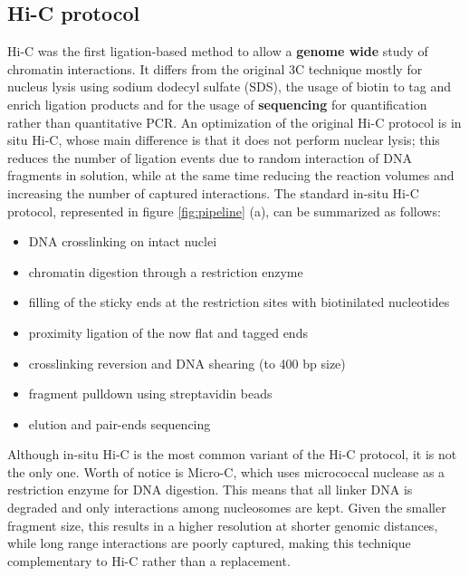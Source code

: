 \subsection{Hi-C protocol}
Hi-C was the first ligation-based method to allow a \textbf{genome wide} study of chromatin interactions. It differs from the original 3C technique mostly for nucleus lysis using sodium dodecyl sulfate (SDS), the usage of biotin to tag and enrich ligation products and for the usage of \textbf{sequencing} for quantification rather than quantitative PCR\cite{hicoriginal2009}. An optimization of the original Hi-C protocol is in situ Hi-C, whose main difference is that it does not perform nuclear lysis; this reduces the number of ligation events due to random interaction of DNA fragments in solution, while at the same time reducing the reaction volumes and increasing the number of captured interactions\cite{insituhic2014}. The standard in-situ Hi-C protocol, represented in figure \ref{fig:pipeline} (a), can be summarized as follows:

\begin{itemize}\tightlist
  \item DNA crosslinking on intact nuclei
  \item chromatin digestion through a restriction enzyme
  \item filling of the sticky ends at the restriction sites with biotinilated nucleotides
  \item proximity ligation of the now flat and tagged ends
  \item crosslinking reversion and DNA shearing (to 400 bp size)
  \item fragment pulldown using streptavidin beads
  \item elution and pair-ends sequencing
\end{itemize}
 
Although in-situ Hi-C is the most common variant of the Hi-C protocol, it is not the only one. Worth of notice is Micro-C, which uses micrococcal nuclease as a restriction enzyme for DNA digestion. This means that all linker DNA is degraded and only interactions among nucleosomes are kept. Given the smaller fragment size, this results in a higher resolution at shorter genomic distances, while long range interactions are poorly captured, making this technique complementary to Hi-C rather than a replacement\cite{microc2015}.


